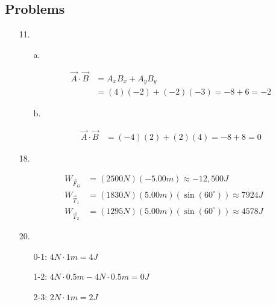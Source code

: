    \subsection*{Problems}

    \begin{itemize}
        \item [11.]
        
            \begin{itemize}
                
                \item [a.]
                
                \begin{align*}
                    \vec{A} \cdot \vec{B}   & = A_{x}B_{x} + A_{y}B_{y}         \\
                                            & = (4)(-2) + (-2)(-3)
                                              = -8 + 6 = \boxed{-2}
                \end{align*}

                \item [b.]
                
                \begin{align*}
                    \vec{A} \cdot \vec{B}   & = (-4)(2) + (2)(4) = -8 + 8 = \boxed{0}
                \end{align*}
            
            \end{itemize}

        \item [18.]
        
            \begin{align*}
                W_{\vec{F}_{G}} & = (2500 N)(-5.00 m) \approx \boxed{-12,500 J}               \\
                W_{\vec{T}_{1}} & = (1830 N)(5.00 m)(\sin(60^{\circ})) \approx \boxed{7924 J} \\
                W_{\vec{T}_{2}} & = (1295 N)(5.00 m)(\sin(60^{\circ})) \approx \boxed{4578 J}
            \end{align*}

        \item [20.]
        
            \begin{itemize}

                \item [0-1:] $4 N \cdot 1 m = 4 J$
                \item [1-2:] $4 N \cdot 0.5 m - 4 N \cdot 0.5 m  = 0 J$
                \item [2-3:] $2 N \cdot 1 m = 2 J$
                

\end{itemize}
\end{itemize}
